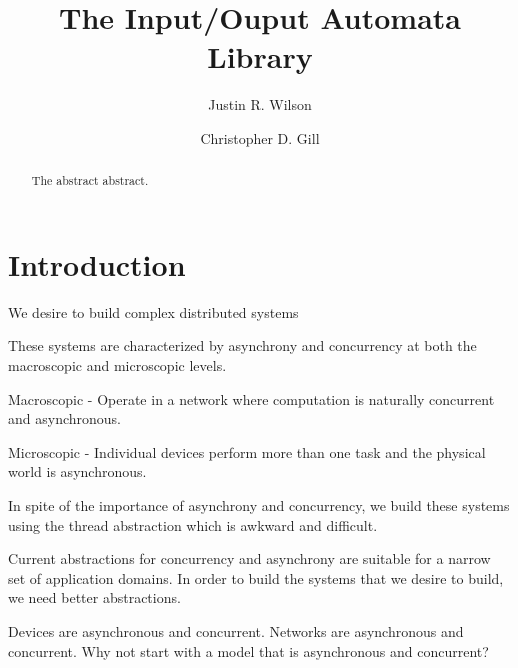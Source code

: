 \documentclass[letterpaper]{article}
\begin{document}
\title{The Input/Ouput Automata Library}
\author{Justin R. Wilson \and Christopher D. Gill}
\date{}

\maketitle

\begin{abstract}
The abstract abstract.
\end{abstract}

\section{Introduction}

\begin{outline}
\item We desire to build complex distributed systems
\item These systems are characterized by asynchrony and concurrency at both the macroscopic and microscopic levels.
  \begin{outline}
  \item Macroscopic - Operate in a network where computation is naturally concurrent and asynchronous.
  \item Microscopic - Individual devices perform more than one task and the physical world is asynchronous.
  \end{outline}
\item In spite of the importance of asynchrony and concurrency, we build these systems using the thread abstraction which is awkward and difficult.

\end{outline}

Current abstractions for concurrency and asynchrony are suitable for a narrow set of application domains.
In order to build the systems that we desire to build, we need better abstractions.

Devices are asynchronous and concurrent.
Networks are asynchronous and concurrent.
Why not start with a model that is asynchronous and concurrent?
\end{document}
